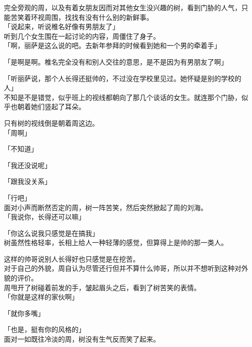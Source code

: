 完全旁观的周，以及有着女朋友因而对其他女生没兴趣的树，看到门胁的人气，只能苦笑着环视周围，找找有没有什么别的新鲜事。\\

「说起来，听说椎名好像有男朋友了」\\

听到几个女生围在一起讨论的内容，周僵住了身子。\\

「啊，丽萨是这么说的吧。去新年参拜的时候看到她和一个男的牵着手」

「是啊是啊。椎名完全没有和别人交往的意思，是不是因为有男朋友了啊」

「听丽萨说，那个人长得还挺帅的，不过没在学校里见过。她怀疑是别的学校的人」\\

不知是不是错觉，似乎班上的视线都朝向了那几个谈话的女生。就连那个门胁，似乎也朝着她们竖起了耳朵。

只有树的视线倒是朝着周这边。\\

「周啊」

「不知道」

「我还没说呢」

「跟我没关系」

「行吧」\\

面对小声而断然否定的周，树一阵苦笑，然后突然掀起了周的刘海。\\

「我说你，长得还可以嘛」

「你这么说我只感觉是在搞我」\\

树虽然性格轻率，长相上给人一种轻薄的感觉，但算得上是帅的那一类人。

这样的帅哥说别人长得好也只感觉是在挖苦。\\

对于自己的外貌，周自认为尽管还行但并不算什么帅哥，所以并不想听到这种对外貌的评价。\\

周甩开了树碰着前发的手，皱起眉头之后，看到了树苦笑的表情。\\

「你就是这样的家伙啊」

「就你多嘴」

「也是，挺有你的风格的」\\

面对一如既往冷淡的周，树没有生气反而笑了起来。\\

\vspace{2\baselineskip}

